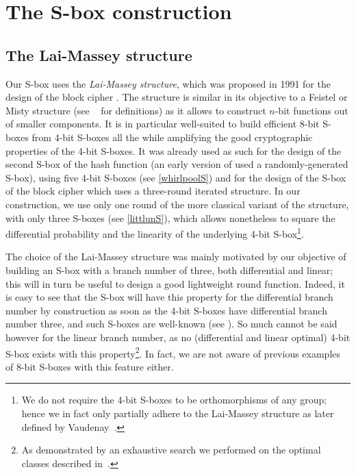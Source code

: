 \section{The \littlun S-box construction}
\label{sec:litt}


\subsection{The Lai-Massey structure}
Our S-box uses the \emph{Lai-Massey structure}, which was proposed in 1991 for the design
of the block cipher \idea \cite{idea}. The structure is similar in its objective to a Feistel or Misty structure
(see \eg{}~\cite{sac15} for definitions)
as it allows to construct $n$-bit functions out of smaller components. It is in particular well-suited
to build efficient 8-bit S-boxes from 4-bit S-boxes all the while amplifying the good cryptographic
properties of the 4-bit S-boxes.
It was already used as such for the design of the second S-box of the \whirlpool hash function
\cite{whirlpool} (an early version of \whirlpool used a randomly-generated S-box), using five
4-bit S-boxes (see \autoref{whirlpoolS})
and for the design of the S-box of the \fox block cipher \cite{fox} which uses a three-round iterated structure.
In our construction, we use only one round of the more classical variant of the structure, with only three S-boxes
(see \autoref{littlunS}), which allows nonetheless to square the differential probability
and the linearity of the underlying 4-bit S-box\footnote{We do not require the 4-bit S-boxes to
be orthomorphisms of any group; hence we in fact only partially adhere to the Lai-Massey structure as later defined
by Vaudenay~\cite{vaudmassey}.}.

The choice of the Lai-Massey structure was mainly motivated by our objective of building
an S-box with a branch number of three, both differential and linear; this will in turn be useful to design a good lightweight round function.
Indeed, it is easy to see that the S-box will
have this property for the differential branch number by construction as soon as the 4-bit S-boxes have differential branch number three,
and such S-boxes are well-known (see \eg \serpent \cite{serpent}). So much cannot be said however for
the linear branch number, as no (differential and linear optimal) 4-bit S-box exists with this property\footnote{As
demonstrated by an exhaustive search we performed on the optimal classes described \eg{} in~\cite{class4bit}.}. In fact, we are not aware
of previous examples of 8-bit S-boxes with this feature either.

